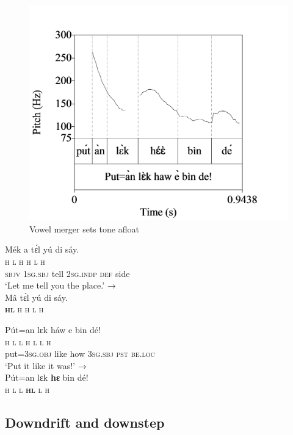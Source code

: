 \begin{figure}    
\includegraphics[height=.3\textheight]{figures/yakpomod-img17.png}
\caption{Vowel merger sets tone afloat}
\label{fig:key:3.15} 
\end{figure}

\ea\label{ex:key:53}
\glll Mék    a    tɛ́l  yú    di  sáy.\\
\textsc{h}    \textsc{l}    \textsc{h}  \textsc{h}    \textsc{l}  \textsc{h}\\
\textsc{sbjv}    \textsc{1sg.sbj}  tell  \textsc{2sg.indp}  \textsc{def}  side\\
\glt ‘Let me tell you the place.’    →\\
\gll Mâ    tɛ́l  yú  di  sáy.\\
\textbf{\textsc{hl}}    \textsc{h}  \textsc{h}  \textsc{l}  \textsc{h}\\
\z

\ea\label{ex:key:54}
\glll   Pút=an    lɛk  háw  e    bin  dé!\\
\textsc{h}  \textsc{l}    \textsc{l}  \textsc{h}  \textsc{l}    \textsc{l}  \textsc{h}\\
put=\textsc{3sg.obj}  like  how  \textsc{3sg.sbj}  \textsc{pst}  \textsc{be.loc}\\
\glt ‘Put it like it was!’    →\\
\gll Pút=an  lɛk  \textbf{hɛ}  bin  dé!\\
\textsc{h}  \textsc{l}  \textsc{l}  \textbf{\textsc{hl}}  \textsc{l}  \textsc{h}\\
\z
\subsection{Downdrift and downstep}\label{sec:3.2.3}

